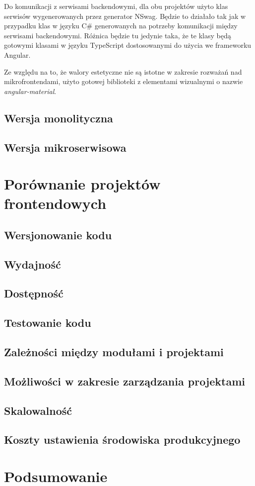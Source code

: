 \documentclass{SGGW-thesis}
\begin{document}
  Do komunikacji z serwisami backendowymi, dla obu projektów użyto klas serwisów wygenerowanych przez generator NSwag. Będzie to działało tak jak w przypadku klas w języku C\# generowanych na potrzeby komunikacji między serwisami backendowymi. Różnica będzie tu jedynie taka, że te klasy będą gotowymi klasami w języku TypeScript dostosowanymi do użycia we frameworku Angular.

  Ze względu na to, że walory estetyczne nie są istotne w zakresie rozważań nad mikrofrontendami, użyto gotowej biblioteki z elementami wizualnymi o nazwie \textit{angular-material}. 

  \section{Wersja monolityczna}
  \section{Wersja mikroserwisowa}

\chapter{Porównanie projektów frontendowych}
  \section{Wersjonowanie kodu}
  \section{Wydajność}
  \section{Dostępność}
  \section{Testowanie kodu}
  \section{Zależności między modułami i projektami}
  \section{Możliwości w zakresie zarządzania projektami}
  \section{Skalowalność}
  \section{Koszty ustawienia środowiska produkcyjnego}

\chapter{Podsumowanie}

\nocite{*}
\printbibliography[heading=bibnumbered,title={Bibliografia}]

\beforelastpage
\end{document}
